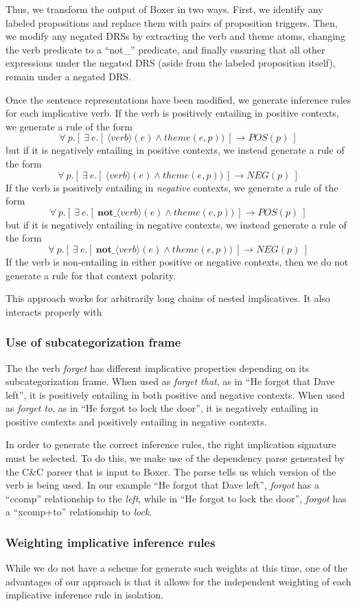 Thus, we transform the output of Boxer in two ways.  First, we identify any
labeled propositions and replace them with pairs of proposition triggers.  Then,
we modify any negated DRSs by extracting the verb and theme atoms, changing the
verb predicate to a ``not\_'' predicate, and finally ensuring that all other
expressions under the negated DRS (aside from the labeled proposition itself),
remain under a negated DRS.

Once the sentence representations have been modified, we generate inference
rules for each implicative verb.  If the verb is positively entailing in
positive contexts, we generate a rule of the form 
\[ \forall~ p.[~ \exists~ e.[~ \langle verb \rangle(e) \land theme(e,p)) ~] \to POS(p) ~] \]
but if it is negatively entailing in positive contexts, we instead generate a rule of the form
\[ \forall~ p.[~ \exists~ e.[~ \langle verb \rangle(e) \land theme(e,p)) ~] \to NEG(p) ~] \]
If the verb is positively entailing in {\it negative} contexts, we generate a rule of the form
\[ \forall~ p.[~ \exists~ e.[~ \textbf{not\_}\langle verb \rangle(e) \land theme(e,p)) ~] \to POS(p) ~] \]
but if it is negatively entailing in negative contexts, we instead generate a rule of the form
\[ \forall~ p.[~ \exists~ e.[~ \textbf{not\_}\langle verb \rangle(e) \land theme(e,p)) ~] \to NEG(p) ~] \]
If the verb is non-entailing in either positive or negative contexts, then we do
not generate a rule for that context polarity. 

This approach works for arbitrarily long chains of nested implicatives.  It also
interacts properly with 



\subsubsection*{Use of subcategorization frame}

The the verb {\it forget} has different implicative properties depending on its
subcategorization frame.  When used as {\it forget that}, as in ``He forgot that
Dave left'', it is positively entailing in both positive and negative contexts. 
When used as {\it forget to}, as in ``He forgot to lock the door'', it is
negatively entailing in positive contexts and positively entailing in negative
contexts.

In order to generate the correct inference rules, the right implication
signature must be selected.  To do this, we make use of the dependency parse
generated by the C\&C parser that is input to Boxer.  The parse tells us which
version of the verb is being used.  In our example ``He forgot that
Dave left'', {\it forgot} has a ``ccomp'' relationship to the {\it left}, while
in ``He forgot to lock the door'', {\it forgot} has a ``xcomp+to'' relationship
to {\it lock}.



\subsubsection*{Weighting implicative inference rules}

While we do not have a scheme for generate such weights at this time, one of the
advantages of our approach is that it allows for the independent weighting of
each implicative inference rule in isolation.  

